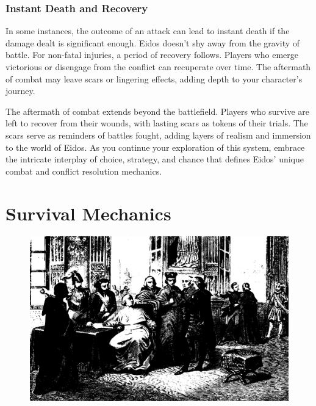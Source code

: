 \documentclass[12pt]{book}  %
\begin{document}
\subsection{Instant Death and Recovery}

In some instances, the outcome of an attack can lead to instant death if the damage dealt is significant enough. Eidos doesn't shy away from the gravity of battle.
For non-fatal injuries, a period of recovery follows. Players who emerge victorious or disengage from the conflict can recuperate over time. The aftermath of combat may leave scars or lingering effects, adding depth to your character's journey.

The aftermath of combat extends beyond the battlefield. Players who survive are left to recover from their wounds, with lasting scars as tokens of their trials. The scars serve as reminders of battles fought, adding layers of realism and immersion to the world of Eidos.
As you continue your exploration of this system, embrace the intricate interplay of choice, strategy, and chance that defines Eidos' unique combat and conflict resolution mechanics.



\chapter{Survival Mechanics}

\begin{figure}[h]
    \centering
    \includegraphics[width=\textwidth]{./images/survival01.pdf}
\end{figure}
\end{document}
